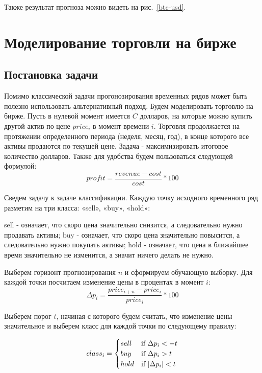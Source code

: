 \documentclass[a4paper,article,14pt]{extarticle}
\begin{document}
Также результат прогноза можно видеть  на рис.~\ref{btc-usd}.


\section{Моделирование торговли на бирже}
\subsection{Постановка задачи}

Помимо классической задачи прогонозирования временных рядов может быть полезно использовать альтернативный подход.
Будем моделировать торговлю на бирже.
Пусть в нулевой момент имеется $C$ долларов, на которые можно купить другой актив по цене $price_i$ в момент времени $i$.
Торговля продолжается на протяжении определенного периода (неделя, месяц, год), в конце которого все активы продаются по текущей цене.
Задача - максимизировать итоговое количество долларов.
Также для удобства будем пользоваться следующей формулой:
$$profit = \frac{revenue - cost}{cost} * 100$$

Сведем задачу к задаче классификации.
Каждую точку исходного временного ряд разметим на три класса: «sell», «buy», «hold»:

sell - означает, что скоро цена значительно снизится, а следовательно нужно продавать активы;
buy - означает, что скоро цена значительно повысится, а следовательно нужно покупать активы;
hold - означает, что цена в ближайшее время значительно не изменится, а значит ничего делать не нужно.

Выберем горизонт прогнозирования $n$ и сформируем обучающую выборку.
Для каждой точки посчитаем изменение цены в процентах в момент $i$:
$$\Delta p_i = \frac{price_{i + n} - price_{i}}{price_{i}} * 100$$

Выберем порог $t$, начиная с которого будем считать, что изменение цены значительное и выберем класс для каждой точки по следующему правилу:

\begin{equation}
class_i =
 \begin{cases}
     sell &\text{if $ \Delta  p_i < -t$}
     \\
     buy &\text{if $\Delta p_i > t$}
     \\
     hold &\text{if $|\Delta p_i| < t$}
 \end{cases}\label{eq:equation3}
\end{equation}
\end{document}
